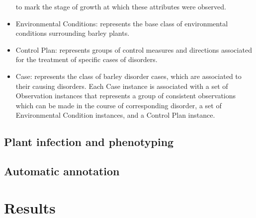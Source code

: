 \documentclass{frontiersSCNS} %
\begin{document}
\begin{itemize}
to mark the stage of growth at which these attributes were observed.
\item Environmental Conditions: represents the base class of environmental conditions
surrounding barley plants.
\item Control Plan: represents groups of control measures and directions associated for the
treatment of specific cases of disorders.
\item Case: represents the class of barley disorder cases, which are associated to their causing
disorders. Each Case instance is associated with a set of Observation instances that
represents a group of consistent observations which can be made in the course of
corresponding disorder, a set of Environmental Condition instances, and a Control Plan
instance.
\end{itemize}


\subsection{Plant infection and phenotyping}


\subsection{Automatic annotation}

\section{Results}





\end{document}
